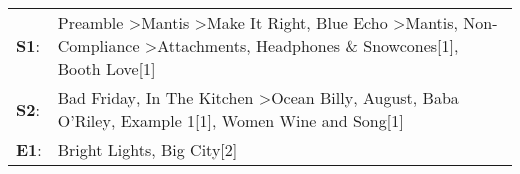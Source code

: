 \begin{supertabular}{p{0.03\textwidth}p{0.92\textwidth}}
 \textbf{S1}:  &  Preamble\textsuperscript{} \textgreater \enspace Mantis\textsuperscript{} \textgreater \enspace Make It Right\textsuperscript{}, \enspace Blue Echo\textsuperscript{} \textgreater \enspace Mantis\textsuperscript{}, \enspace Non-Compliance\textsuperscript{} \textgreater \enspace Attachments\textsuperscript{}, \enspace Headphones \& Snowcones[1]\textsuperscript{}, \enspace Booth Love[1]\textsuperscript{}  \enspace  \\
 \textbf{S2}:  &                                                                                                                   Bad Friday\textsuperscript{}, \enspace In The Kitchen\textsuperscript{} \textgreater \enspace Ocean Billy\textsuperscript{}, \enspace August\textsuperscript{}, \enspace Baba O'Riley\textsuperscript{}, \enspace Example 1[1]\textsuperscript{}, \enspace Women Wine and Song[1]\textsuperscript{}  \enspace  \\
 \textbf{E1}:  &                                                                                                                                                                                                                                                                                                                                                                          Bright Lights, Big City[2]\textsuperscript{}  \enspace  \\
\end{supertabular}
